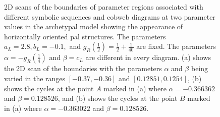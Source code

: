 \begin{figure}
	\centering
	\caption[2D scans of the boundaries of parameter regions associated with different symbolic sequences and cobweb diagrams at two parameter values in the archetypal model showing the appearance of horizontally oriented period-adding-like structures]{
		2D scans of the boundaries of parameter regions associated with different symbolic sequences and cobweb diagrams at two parameter values in the archetypal model showing the appearance of horizontally oriented \gls{pal} structures.
		The parameters $a_L = 2.8, b_L = -0.1,$ and $g_R\left(\frac{1}{2}\right) = \frac{1}{2} + \frac{1}{40}$ are fixed.
		The parameters $\alpha = -g_R\left(\frac{1}{4}\right)$ and $\beta = c_L$ are different in every diagram.
		(a) shows the 2D scan of the boundaries with the parameters $\alpha$ and $\beta$ being varied in the ranges $[-0.37, -0.36]$ and $[0.12851, 0.1254]$,
		(b) shows the cycles at the point $A$ marked in (a) where $\alpha = -0.366362$ and $\beta = 0.128526$,
		and (b) shows the cycles at the point $B$ marked in (a) where $\alpha = -0.363022$ and $\beta = 0.128526$.
	}
\end{figure}

